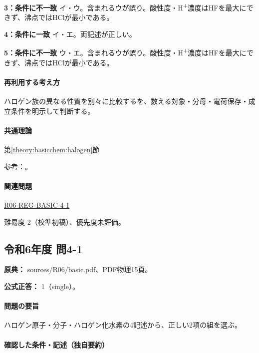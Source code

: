 \noindent\textbf{3：条件に不一致} イ・ウ。含まれるウが誤り。酸性度・H\textsuperscript{+}濃度はHFを最大にできず、沸点ではHClが最小である。\par

\noindent\textbf{4：条件に一致} イ・エ。両記述が正しい。\par

\noindent\textbf{5：条件に不一致} ウ・エ。含まれるウが誤り。酸性度・H\textsuperscript{+}濃度はHFを最大にできず、沸点ではHClが最小である。\par

\paragraph{再利用する考え方} ハロゲン族の異なる性質を別々に比較するを、数える対象・分母・電荷保存・成立条件を明示して判断する。

\paragraph{共通理論} \hyperref[theory:basicchem:halogen]{第\ref*{theory:basicchem:halogen}節}

\par 参考：\cite{purdue_halogens,rsc_halogen,nist_halogen_properties,msu_hydrogen_bonding,purdue_acid_strength,yale_hydrohalic}。

\paragraph{関連問題} \hyperref[q:r06-reg-basic-4-1]{R06-REG-BASIC-4-1}

\par 難易度 2（校準初稿）、優先度未評価。

\subsection{令和6年度 問4-1}
\label{q:r06-reg-basic-4-1}

\noindent\textbf{原典：} sources/R06/basic.pdf、PDF物理15頁。

\textbf{公式正答：} 1（single）。

\paragraph{問題の要旨} ハロゲン原子・分子・ハロゲン化水素の4記述から、正しい2項の組を選ぶ。

\paragraph{確認した条件・記述（独自要約）}\mbox{}\par

